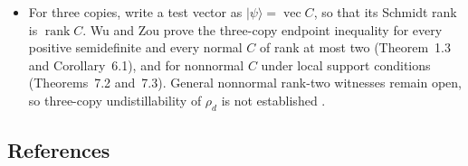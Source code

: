 \begin{itemize}
  \item For three copies, write a test vector as
  $\lvert\psi\rangle=\operatorname{vec}C$, so that its Schmidt rank is
  $\operatorname{rank}C$.  Wu and Zou prove the three-copy endpoint inequality
  for every positive semidefinite and every normal $C$ of rank at most two
  (Theorem~1.3 and Corollary~6.1), and for nonnormal $C$ under local support
  conditions (Theorems~7.2 and~7.3).  General nonnormal rank-two witnesses
  remain open, so three-copy undistillability of $\rho_d$ is not established
  .
\end{itemize}

\subsection*{References}

